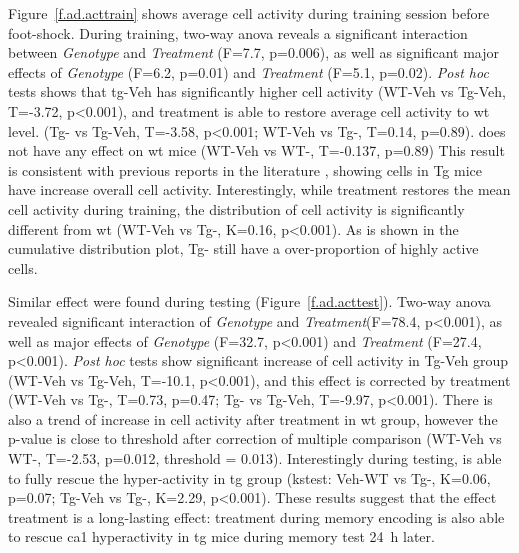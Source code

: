 Figure~\ref{f.ad.acttrain} shows average cell activity during training session before foot-shock. During training, two-way \gls{anova} reveals a significant interaction between \textit{Genotype} and \textit{Treatment} (F=7.7, p=0.006), as well as significant major effects of \textit{Genotype} (F=6.2, p=0.01) and \textit{Treatment} (F=5.1, p=0.02). \textit{Post hoc} tests shows that \gls{tg}-Veh has significantly higher cell activity (WT-Veh vs Tg-Veh, T=-3.72, p<0.001), and \tglu{} treatment is able to restore average cell activity to \gls{wt} level. (Tg-\glu{} vs Tg-Veh, T=-3.58, p<0.001; WT-Veh vs Tg-\glu, T=0.14, p=0.89). \tglu{} does not have any effect on \gls{wt} mice (WT-Veh vs WT-\glu, T=-0.137, p=0.89) This result is consistent with previous reports in the literature \citep{verret12}, showing cells in Tg mice have increase overall cell activity. Interestingly, while \tglu{} treatment restores the mean cell activity during training, the distribution of cell activity is significantly different from \gls{wt} (WT-Veh vs Tg-\glu, K=0.16, p<0.001). As is shown in the cumulative distribution plot, Tg-\glu{} still have a over-proportion of highly active cells. 

Similar effect were found during testing (Figure~\ref{f.ad.acttest}). Two-way \gls{anova} revealed significant interaction of \textit{Genotype} and \textit{Treatment}(F=78.4, p<0.001), as well as major effects of \textit{Genotype} (F=32.7, p<0.001) and \textit{Treatment} (F=27.4, p<0.001). \textit{Post hoc} tests show significant increase of cell activity in Tg-Veh group (WT-Veh vs Tg-Veh, T=-10.1, p<0.001), and this effect is corrected by \tglu{} treatment (WT-Veh vs Tg-\glu, T=0.73, p=0.47; Tg-\glu{} vs Tg-Veh, T=-9.97, p<0.001). There is also a trend of increase in cell activity after \tglu{} treatment in \gls{wt} group, however the p-value is close to threshold after correction of multiple comparison (WT-Veh vs WT-\glu, T=-2.53, p=0.012, threshold = 0.013). Interestingly during testing, \tglu{} is able to fully rescue the hyper-activity in \gls{tg} group (\gls{kstest}: Veh-WT vs Tg-\glu, K=0.06, p=0.07; Tg-Veh vs Tg-\glu, K=2.29, p<0.001). These results suggest that the effect \tglu{} treatment is a long-lasting effect: treatment during memory encoding is also able to rescue \gls{ca1} hyperactivity in \gls{tg} mice during memory test \SI{24}{\hour} later.

